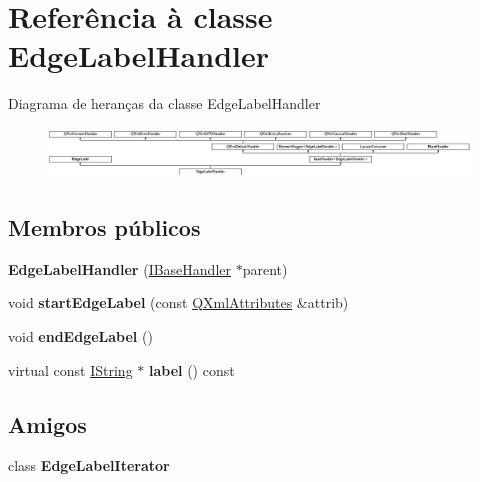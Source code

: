 \hypertarget{class_edge_label_handler}{\section{Referência à classe Edge\-Label\-Handler}
\label{class_edge_label_handler}
}
Diagrama de heranças da classe Edge\-Label\-Handler\begin{figure}[H]
\begin{center}
\leavevmode
\includegraphics[height=1.350211cm]{class_edge_label_handler}
\end{center}
\end{figure}
\subsection*{Membros públicos}
\begin{DoxyCompactItemize}
\item 
\hypertarget{class_edge_label_handler_a35df764f2bc4d057bf1908f8ab1bce33}{{\bfseries Edge\-Label\-Handler} (\hyperlink{class_i_base_handler}{I\-Base\-Handler} $\ast$parent)}\label{class_edge_label_handler_a35df764f2bc4d057bf1908f8ab1bce33}

\item 
\hypertarget{class_edge_label_handler_a9f087a53fd7db00c162608d0e76ee37d}{void {\bfseries start\-Edge\-Label} (const \hyperlink{class_q_xml_attributes}{Q\-Xml\-Attributes} \&attrib)}\label{class_edge_label_handler_a9f087a53fd7db00c162608d0e76ee37d}

\item 
\hypertarget{class_edge_label_handler_a86bb4d908d0ffc8cfcfe9df9430c132e}{void {\bfseries end\-Edge\-Label} ()}\label{class_edge_label_handler_a86bb4d908d0ffc8cfcfe9df9430c132e}

\item 
\hypertarget{class_edge_label_handler_a697b0f76328ea9fba4738c74a07cb8c7}{virtual const \hyperlink{class_i_string}{I\-String} $\ast$ {\bfseries label} () const }\label{class_edge_label_handler_a697b0f76328ea9fba4738c74a07cb8c7}

\end{DoxyCompactItemize}
\subsection*{Amigos}
\begin{DoxyCompactItemize}
\item 
\hypertarget{class_edge_label_handler_af04914e6743dfa65bd97548d5db241fc}{class {\bfseries Edge\-Label\-Iterator}}\label{class_edge_label_handler_af04914e6743dfa65bd97548d5db241fc}

\end{DoxyCompactItemize}
